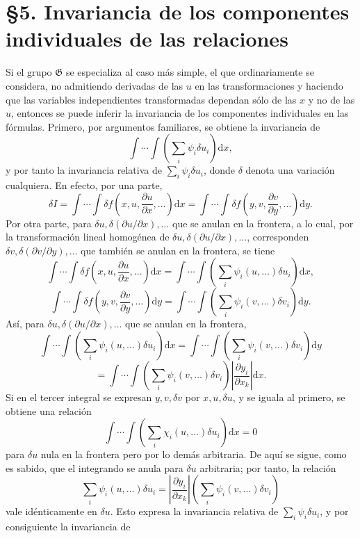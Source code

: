 \documentclass[11pt]{article}
\providecommand{\dd}{\mathrm d}
\providecommand{\G}{\mathfrak G}
\providecommand{\p}{\partial}
\begin{document}
\section*{\S{}5. Invariancia de los componentes individuales de las relaciones}

Si el grupo \(\G\) se especializa al caso más simple, el que ordinariamente se considera, no admitiendo derivadas de las \(u\) en las transformaciones y haciendo que las variables independientes transformadas dependan sólo de las \(x\) y no de las \(u\), entonces se puede inferir la invariancia de los componentes individuales en las fórmulas. Primero, por argumentos familiares, se obtiene la invariancia de
\[
\int\!\cdots\!\int\left(\sum_i\psi_i\delta u_i\right)\dd x,
\]
y por tanto la invariancia relativa de \(\sum_i\psi_i\delta u_i\), donde \(\delta\) denota una variación cualquiera. En efecto, por una parte,
\[
\delta I
=\int\!\cdots\!\int \delta f\!\left(x,u,\frac{\p u}{\p x},\ldots\right)\dd x
=\int\!\cdots\!\int \delta f\!\left(y,v,\frac{\p v}{\p y},\ldots\right)\dd y.
\]
Por otra parte, para \(\delta u,\delta(\p u/\p x),\ldots\) que se anulan en la frontera, a lo cual, por la transformación lineal homogénea de \(\delta u,\delta(\p u/\p x),\ldots\), corresponden \(\delta v,\delta(\p v/\p y),\ldots\) que también se anulan en la frontera, se tiene
\[
\int\!\cdots\!\int \delta f\!\left(x,u,\frac{\p u}{\p x},\ldots\right)\dd x
=
\int\!\cdots\!\int\left(\sum_i\psi_i(u,\ldots)\delta u_i\right)\dd x,
\]
\[
\int\!\cdots\!\int \delta f\!\left(y,v,\frac{\p v}{\p y},\ldots\right)\dd y
=
\int\!\cdots\!\int\left(\sum_i\psi_i(v,\ldots)\delta v_i\right)\dd y.
\]
Así, para \(\delta u,\delta(\p u/\p x),\ldots\) que se anulan en la frontera,
\[
\int\!\cdots\!\int\left(\sum_i\psi_i(u,\ldots)\delta u_i\right)\dd x
=
\int\!\cdots\!\int\left(\sum_i\psi_i(v,\ldots)\delta v_i\right)\dd y
\]
\[
=
\int\!\cdots\!\int\left(\sum_i\psi_i(v,\ldots)\delta v_i\right)
\left|\frac{\p y_i}{\p x_k}\right|\dd x.
\]
Si en el tercer integral se expresan \(y,v,\delta v\) por \(x,u,\delta u\), y se iguala al primero, se obtiene una relación
\[
\int\!\cdots\!\int\left(\sum_i\chi_i(u,\ldots)\delta u_i\right)\dd x=0
\]
para \(\delta u\) nula en la frontera pero por lo demás arbitraria. De aquí se sigue, como es sabido, que el integrando se anula para \(\delta u\) arbitraria; por tanto, la relación
\[
\sum_i\psi_i(u,\ldots)\delta u_i
=
\left|\frac{\p y_i}{\p x_k}\right|
\left(\sum_i\psi_i(v,\ldots)\delta v_i\right)
\]
vale idénticamente en \(\delta u\). Esto expresa la invariancia relativa de \(\sum_i\psi_i\delta u_i\), y por consiguiente la invariancia de
\end{document}
